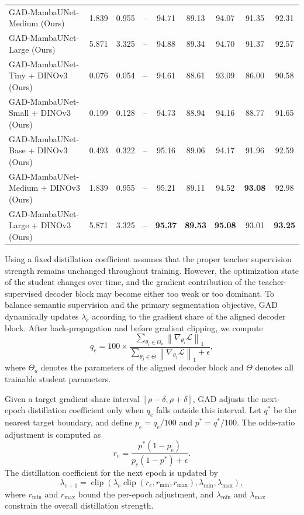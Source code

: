\begin{table}[h]
{\begin{tabular}{lcccccccc}
        GAD-MambaUNet-Medium (Ours) & 1.839 & 0.955 & -- & 94.71 & 89.13 & 94.07 & 91.35 & 92.31 \\
        GAD-MambaUNet-Large (Ours) & 5.871 & 3.325 & -- & 94.88 & 89.34 & 94.70 & 91.37 & 92.57 \\
        \midrule
        GAD-MambaUNet-Tiny + DINOv3 (Ours) & 0.076 & 0.054 & -- & 94.61 & 88.61 & 93.09 & 86.00 & 90.58 \\
        GAD-MambaUNet-Small + DINOv3 (Ours) & 0.199 & 0.128 & -- & 94.73 & 88.94 & 94.16 & 88.77 & 91.65 \\
        GAD-MambaUNet-Base + DINOv3 (Ours) & 0.493 & 0.322 & -- & 95.16 & 89.06 & 94.17 & 91.96 & 92.59 \\
        GAD-MambaUNet-Medium + DINOv3 (Ours) & 1.839 & 0.955 & -- & 95.21 & 89.11 & 94.52 & \textbf{93.08} & 92.98 \\
        GAD-MambaUNet-Large + DINOv3 (Ours) & 5.871 & 3.325 & -- & \textbf{95.37} & \textbf{89.53} & \textbf{95.08} & 93.01 & \textbf{93.25} \\
        \bottomrule
    \end{tabular}
    }
\end{table}




Using a fixed distillation coefficient assumes that the proper teacher supervision strength remains unchanged throughout training. However, the optimization state of the student changes over time, and the gradient contribution of the teacher-supervised decoder block may become either too weak or too dominant. To balance semantic supervision and the primary segmentation objective, GAD dynamically updates $\lambda_e$ according to the gradient share of the aligned decoder block. After back-propagation and before gradient clipping, we compute
\begin{equation}
q_e
=
100\times
\frac{
\sum_{\theta_i\in\Theta_a}
\left\|\nabla_{\theta_i}\mathcal{L}\right\|_1
}{
\sum_{\theta_j\in\Theta}
\left\|\nabla_{\theta_j}\mathcal{L}\right\|_1
+\epsilon
},
\end{equation}
where $\Theta_a$ denotes the parameters of the aligned decoder block and $\Theta$ denotes all trainable student parameters.

Given a target gradient-share interval $[\rho-\delta,\rho+\delta]$, GAD adjusts the next-epoch distillation coefficient only when $q_e$ falls outside this interval. Let $q^{*}$ be the nearest target boundary, and define $p_e=q_e/100$ and $p^{*}=q^{*}/100$. The odds-ratio adjustment is computed as
\begin{equation}
r_e
=
\frac{
p^{*}(1-p_e)
}{
p_e(1-p^{*})+\epsilon
}.
\end{equation}
The distillation coefficient for the next epoch is updated by
\begin{equation}
\lambda_{e+1}
=
\operatorname{clip}
\left(
\lambda_e
\operatorname{clip}(r_e,r_{\min},r_{\max}),
\lambda_{\min},
\lambda_{\max}
\right),
\end{equation}
where $r_{\min}$ and $r_{\max}$ bound the per-epoch adjustment, and $\lambda_{\min}$ and $\lambda_{\max}$ constrain the overall distillation strength.

